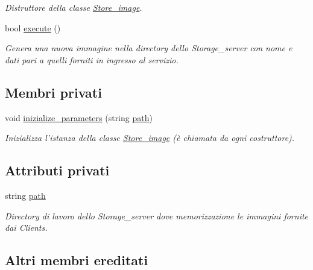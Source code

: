 \begin{DoxyCompactItemize}
\begin{DoxyCompactList}\small\item\em Distruttore della classe \hyperlink{class_store__image}{Store\-\_\-image}. \end{DoxyCompactList}\item 
bool \hyperlink{class_store__image_a4023d6ecc72801dcbc52b30e89f17b2b}{execute} ()
\begin{DoxyCompactList}\small\item\em Genera una nuova immagine nella directory dello {\itshape Storage\-\_\-server} con nome e dati pari a quelli forniti in ingresso al servizio. \end{DoxyCompactList}\end{DoxyCompactItemize}
\subsection*{Membri privati}
\begin{DoxyCompactItemize}
\item 
void \hyperlink{class_store__image_a4156bdcb994ac460690dce12fbdeee79}{inizialize\-\_\-parameters} (string \hyperlink{class_store__image_ae7e32f8d0404e94e02a234ec54a17d70}{path})
\begin{DoxyCompactList}\small\item\em Inizializza l'istanza della classe \hyperlink{class_store__image}{Store\-\_\-image} (è chiamata da ogni costruttore). \end{DoxyCompactList}\end{DoxyCompactItemize}
\subsection*{Attributi privati}
\begin{DoxyCompactItemize}
\item 
\hypertarget{class_store__image_ae7e32f8d0404e94e02a234ec54a17d70}{string \hyperlink{class_store__image_ae7e32f8d0404e94e02a234ec54a17d70}{path}}\label{class_store__image_ae7e32f8d0404e94e02a234ec54a17d70}

\begin{DoxyCompactList}\small\item\em Directory di lavoro dello {\itshape Storage\-\_\-server} dove memorizzazione le immagini fornite dai {\itshape Clients}. \end{DoxyCompactList}\end{DoxyCompactItemize}
\subsection*{Altri membri ereditati}


